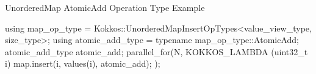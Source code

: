 
\begin{frame}[fragile]{UnorderedMap AtomicAdd Operation Type Example}
  
  \begin{code}[keywords={UnorderedMap Insertion Example}]

using map_op_type    
  = Kokkos::UnorderedMapInsertOpTypes<value_view_type, size_type>;
using atomic_add_type = typename map_op_type::AtomicAdd;
atomic_add_type atomic_add;
parallel_for(N, KOKKOS_LAMBDA (uint32_t i) {
  map.insert(i, values(i), atomic_add);
});

\end{code}

\end{frame}



